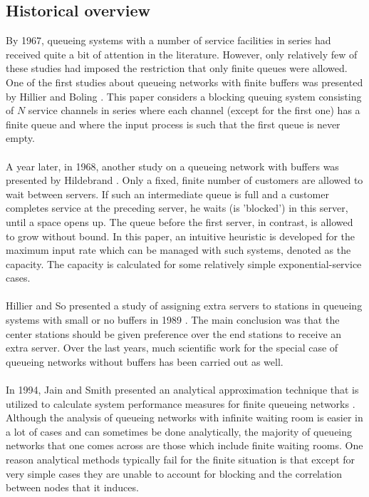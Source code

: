 \documentclass[twoside]{article}
\begin{document}
\begin{multicols}{2}
\subsection{\textbf{Historical overview}}
By 1967, queueing systems with a number of service facilities in series had received quite a bit of attention in the literature. However, only relatively few of these studies had imposed the restriction that only finite queues were allowed. 
One of the first studies about queueing networks with finite buffers was presented by Hillier and Boling \cite{extrahillier}. This paper considers a blocking queuing system consisting of $N$ service channels in series where each channel  (except for the first one) has a finite queue and where the input process is such that the first queue is never empty. \\\\
A year later, in 1968, another study on a queueing network with buffers was presented by Hildebrand \cite{article2}. Only a fixed, finite number of customers are allowed to wait between servers. If such an intermediate queue is full and a customer completes service at the preceding server, he waits (is 'blocked') in this server, until a space opens up. The queue before the first server, in contrast, is allowed to grow without bound. In this paper, an intuitive heuristic is developed for the maximum input rate which can be managed with such systems, denoted as the capacity. The capacity is calculated for some relatively simple exponential-service cases. \\\\
Hillier and So presented a study of assigning extra servers to stations in queueing systems with small or no buffers in 1989 \cite{article20}. The main conclusion was that the center stations should be given preference over the end stations to receive an extra server. Over the last years, much scientific work for the special case of queueing networks without buffers has been carried out as well. \\\\
In 1994, Jain and Smith presented an analytical approximation technique that is utilized to calculate system performance measures for finite queueing networks \cite{article7}. Although the analysis of queueing networks with infinite waiting room is easier in a lot of cases and can sometimes be done analytically, the majority of queueing networks that one comes across are those which include finite waiting rooms. One reason analytical methods typically fail for the finite situation is that except for very simple cases they are unable to account for blocking and the correlation between nodes that it induces. \\\\

\end{multicols}
\end{document}
